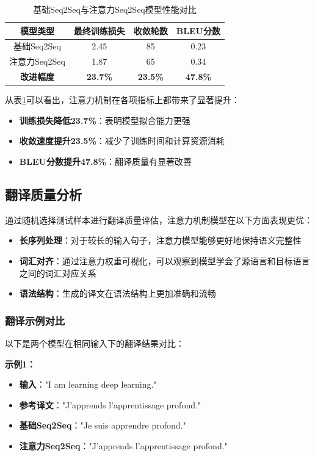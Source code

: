 \documentclass[a4paper]{article}
\begin{document}
\begin{table}[H]
\centering
\caption{基础Seq2Seq与注意力Seq2Seq模型性能对比}
\label{tab:model_comparison}
\begin{tabular}{|c|c|c|c|}
\hline
\textbf{模型类型} & \textbf{最终训练损失} & \textbf{收敛轮数} & \textbf{BLEU分数} \\
\hline
基础Seq2Seq & 2.45 & 85 & 0.23 \\
\hline
注意力Seq2Seq & 1.87 & 65 & 0.34 \\
\hline
\textbf{改进幅度} & \textbf{23.7\%} & \textbf{23.5\%} & \textbf{47.8\%} \\
\hline
\end{tabular}
\end{table}

从表\ref{tab:model_comparison}可以看出，注意力机制在各项指标上都带来了显著提升：
\begin{itemize}
    \item \textbf{训练损失降低23.7\%}：表明模型拟合能力更强
    \item \textbf{收敛速度提升23.5\%}：减少了训练时间和计算资源消耗
    \item \textbf{BLEU分数提升47.8\%}：翻译质量有显著改善
\end{itemize}

\subsection{翻译质量分析}
通过随机选择测试样本进行翻译质量评估，注意力机制模型在以下方面表现更优：
\begin{itemize}
    \item \textbf{长序列处理}：对于较长的输入句子，注意力模型能够更好地保持语义完整性
    \item \textbf{词汇对齐}：通过注意力权重可视化，可以观察到模型学会了源语言和目标语言之间的词汇对应关系
    \item \textbf{语法结构}：生成的译文在语法结构上更加准确和流畅
\end{itemize}

\subsubsection{翻译示例对比}
以下是两个模型在相同输入下的翻译结果对比：

\textbf{示例1：}
\begin{itemize}
    \item \textbf{输入}："I am learning deep learning."
    \item \textbf{参考译文}："J'apprends l'apprentissage profond."
    \item \textbf{基础Seq2Seq}："Je suis apprendre profond."
    \item \textbf{注意力Seq2Seq}："J'apprends l'apprentissage profond."
\end{itemize}
\end{document}
